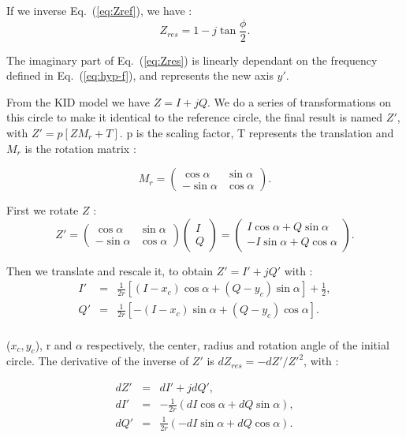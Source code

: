 If we inverse Eq.~(\ref{eq:Zref}), we have : 
\begin{equation}
Z_{res} = 1 - j \tan \frac{\phi}{2}.
\label{eq:Zres}
\end{equation}

The imaginary part of Eq.~(\ref{eq:Zres}) is linearly dependant on the frequency defined in Eq.~(\ref{eq:hyp-f}), and represents the new axis $y'$.

From the KID model we have $Z=I+jQ$. We do a series of transformations on this circle to make it identical to the reference circle, the final result is named $Z'$, with $Z'=p[ZM_{r} + T]$. p is the scaling factor, T represents the translation and $M_{r}$ is the rotation matrix : 

\begin{equation}
M_{r} = 
\begin{pmatrix}
	\cos \alpha & \sin \alpha \\
	-\sin \alpha & \cos \alpha
\end{pmatrix} .
\end{equation}


First we rotate $Z$ :
\begin{equation}
Z' = 
\begin{pmatrix}
	\cos \alpha & \sin \alpha \\
	-\sin \alpha & \cos \alpha
\end{pmatrix}
\begin{pmatrix}
	I\\
	Q
\end{pmatrix}
=
\begin{pmatrix}
	I\cos \alpha + Q\sin \alpha\\
  - I\sin \alpha + Q\cos \alpha
\end{pmatrix}.
\end{equation}

Then we translate and rescale it, to obtain $Z'=I'+jQ'$ with : 
\begin{eqnarray}
I' &=& \frac{1}{2r}[(I-x_{c}) \cos \alpha + (Q - y_{c}) \sin \alpha] + \frac{1}{2}, \\
Q' &=& \frac{1}{2r}[-(I-x_{c}) \sin \alpha + (Q - y_{c}) \cos \alpha]. \\
\end{eqnarray}

($x_{c}, y_{c}$), r and $\alpha$ respectively, the center, radius and rotation angle of the initial circle. The derivative of the inverse of $Z'$ is $dZ_{res}=-dZ'/Z'^{2}$, with :

\begin{eqnarray}
dZ' &=& dI' + jdQ',\\
dI' &=& -\frac{1}{2r}(dI \cos \alpha + dQ \sin \alpha), \\
dQ' &=& \frac{1}{2r}(-dI \sin \alpha + dQ \cos \alpha).
\end{eqnarray}


